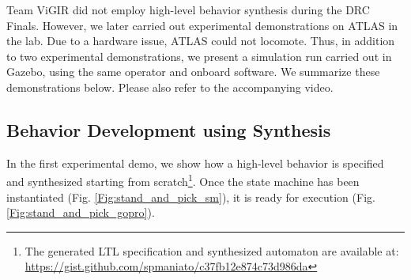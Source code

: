 
Team ViGIR did not employ high-level behavior synthesis during the DRC Finals.
However, we later carried out experimental demonstrations on ATLAS in the lab.
Due to a hardware issue, ATLAS could not locomote.
Thus, in addition to two experimental demonstrations, we present a simulation run carried out in Gazebo, using the same operator and onboard software.
We summarize these demonstrations below.
Please also refer to the accompanying video.

\subsection{Behavior Development using Synthesis}

In the first experimental demo, we show how a high-level behavior is specified and synthesized starting from scratch\footnote{The generated LTL specification and synthesized automaton are available at: \scriptsize{\url{https://gist.github.com/spmaniato/c37fb12e874c73d986da}}}.
Once the state machine has been instantiated (Fig. \ref{Fig:stand_and_pick_sm}), it is ready for execution (Fig. \ref{Fig:stand_and_pick_gopro}).

